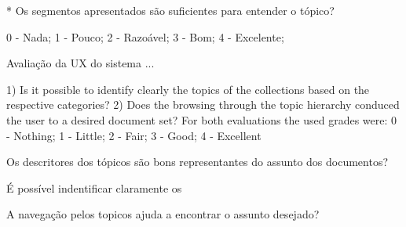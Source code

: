 * Os segmentos apresentados são suficientes para entender o tópico?





0 - Nada;
1 - Pouco;
2 - Razoável;
3 - Bom;
4 - Excelente;



Avaliação da UX do sistema ...























1) Is it possible to identify clearly the topics of the collections
based on the respective categories?
2) Does the browsing through the topic hierarchy conduced
the user to a desired document set?
For both evaluations the used grades were:
0 - Nothing;
1 - Little;
2 - Fair;
3 - Good;
4 - Excellent


\item Os descritores dos tópicos são bons representantes do assunto dos documentos?
\item É possível indentificar claramente os 
\item A navegação pelos topicos ajuda a encontrar o assunto desejado?







